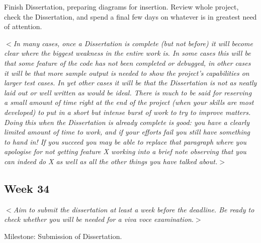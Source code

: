 \documentclass[12pt]{article}
\newcommand{\al}{$<$}
\newcommand{\ar}{$>$}
\begin{document}
Finish Dissertation, preparing diagrams for insertion.  Review whole
project, check the Dissertation, and spend a final few days on
whatever is in greatest need of attention.

\al\emph{In many cases, once a Dissertation is complete (but not
  before) it will become clear where the biggest weakness in the
  entire work is.  In some cases this will be that some feature of the
  code has not been completed or debugged, in other cases it will be
  that more sample output is needed to show the project's capabilities
  on larger test cases.  In yet other cases it will be that the
  Dissertation is not as neatly laid out or well written as would be
  ideal.  There is much to be said for reserving a small amount of
  time right at the end of the project (when your skills are most
  developed) to put in a short but intense burst of work to try to
  improve matters.  Doing this when the Dissertation is already
  complete is good: you have a clearly limited amount of time to work,
  and if your efforts fail you still have something to hand in!  If
  you succeed you may be able to replace that paragraph where you
  apologise for not getting feature X working into a brief note
  observing that you can indeed do X as well as all the other things
  you have talked about.}\ar


\subsection*{Week 34}

\al\emph{Aim to submit the dissertation at least a week before the
  deadline. Be ready to check whether you will be needed for a\/ {\rm
    viva voce} examination}.\ar

Milestone: Submission of Dissertation. 
\end{document}
